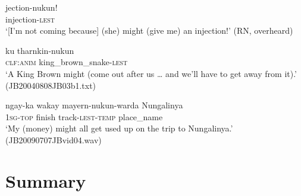 \documentclass[output=paper,colorlinks,citecolor=brown]{langscibook}
\begin{document}
\ea\label{ex:mur:83}
    \gll jection-nukun!\\
         injection-\textsc{lest}\\
    \glt ‘[I’m not coming because] (she) might (give me) an injection!’ (RN, overheard)
\z 

\ea\label{ex:mur:84}
    \gll ku tharnkin-nukun\\
          \textsc{clf:anim} king\_brown\_snake-\textsc{lest} \\
    \glt ‘A King Brown might (come out after us … and we’ll have to get away from it).’ (JB20040808JB03b1.txt)
\z 

\ea\label{ex:mur:85}
    \gll ngay-ka wakay mayern-nukun-warda Nungalinya\\
         1\textsc{sg-top} finish track-\textsc{lest-temp} place\_name\\
    \glt ‘My (money) might all get used up on the trip to Nungalinya.’ (JB20090707JBvid04.wav)
\z 

\section{Summary} \label{sec:mur:5}
\end{document}
